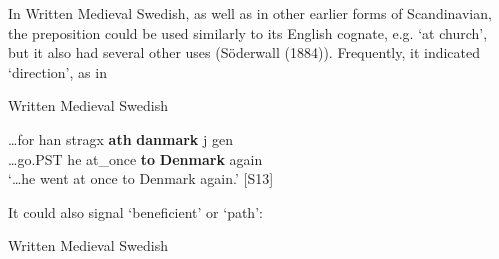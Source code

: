 
In Written Medieval Swedish, as well as in other earlier forms of Scandinavian, the preposition  could be used similarly to its English cognate, e.g.  ‘at church’, but it also had several other uses (Söderwall (1884)). Frequently, it indicated ‘direction’, as in


\item 

Written Medieval Swedish



 \ea\label{}
\gll …for  han  stragx  \textbf{ath} \textbf{danmark} j gen\\


…go.PST  he  at\_once  \textbf{to} \textbf{Denmark} again\\

\glt ‘…he went at once to Denmark again.’ [S13]

\z

It could also signal ‘beneficient’ or ‘path’:


\item 

Written Medieval Swedish



\item 


